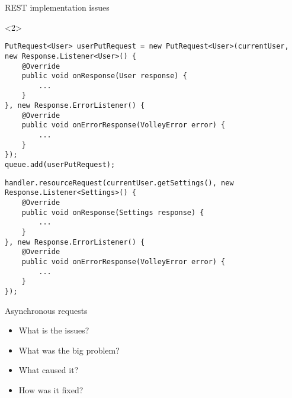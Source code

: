 \begin{frame}[fragile]{REST implementation issues}

\begin{onlyenv}<2>
\begin{center}
\begin{minipage}[H]{0.9\linewidth}
\begin{lstlisting}    
PutRequest<User> userPutRequest = new PutRequest<User>(currentUser, new Response.Listener<User>() {
	@Override
    public void onResponse(User response) {
    	...
    }
}, new Response.ErrorListener() {
    @Override
    public void onErrorResponse(VolleyError error) {
		...
    }
});
queue.add(userPutRequest);
\end{lstlisting} 
\begin{lstlisting}
handler.resourceRequest(currentUser.getSettings(), new Response.Listener<Settings>() {
	@Override
	public void onResponse(Settings response) {
		...	
	}
}, new Response.ErrorListener() {
	@Override
    public void onErrorResponse(VolleyError error) {
    	...
    }
});
\end{lstlisting} 
\end{minipage}
\end{center}
\end{onlyenv}
\end{frame}


\begin{frame}{Asynchronous requests}
\begin{itemize}
  \item What is the issues?
  \item What was the big problem?
  \item What caused it?
  \item How was it fixed?
\end{itemize}
\end{frame}

